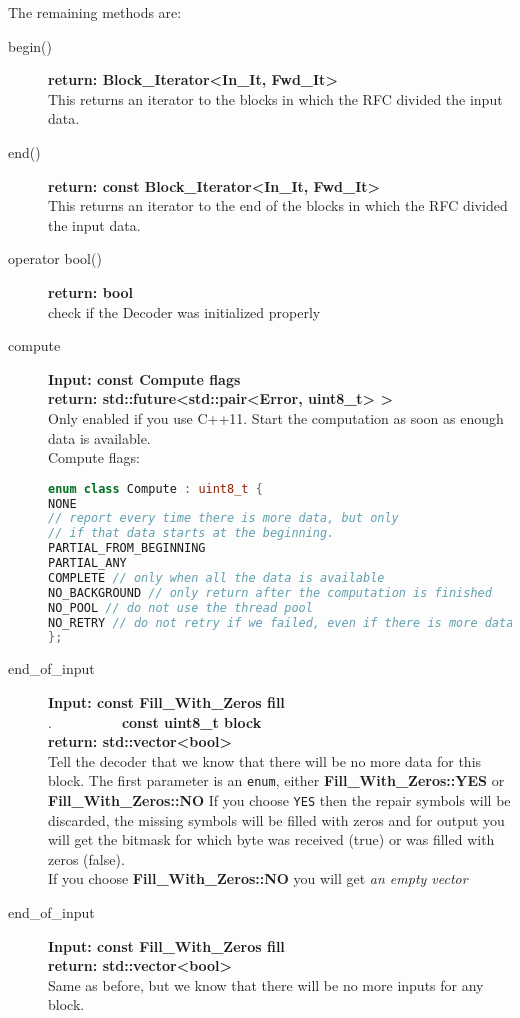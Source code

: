 \documentclass[11pt,a4paper]{refart}
\begin{document}
The remaining methods are:
\begin{description}
\item[begin()] \textbf{return: Block\_Iterator<In\_It, Fwd\_It>}\\
This returns an iterator to the blocks in which the RFC divided the input data.
\item[end()] \textbf{return: const Block\_Iterator<In\_It, Fwd\_It>}\\
This returns an iterator to the end of the blocks in which the RFC divided the input data.
\item[operator bool()] \textbf{return: bool}\\
check if the Decoder was initialized properly

\item[compute] \textbf{Input: const Compute flags}\\
\textbf{return: std::future<std::pair<Error, uint8\_t> >}\\
Only enabled if you use C++11. Start the computation as soon as enough data is available.\\
Compute flags:
\begin{lstlisting}[language=C++]
enum class Compute : uint8_t {
NONE 
// report every time there is more data, but only
// if that data starts at the beginning.
PARTIAL_FROM_BEGINNING
PARTIAL_ANY
COMPLETE // only when all the data is available
NO_BACKGROUND // only return after the computation is finished
NO_POOL // do not use the thread pool
NO_RETRY // do not retry if we failed, even if there is more data
};
\end{lstlisting}

\item[end\_of\_input] \textbf{Input: const Fill\_With\_Zeros fill}\\
.\ \ \ \ \ \ \ \ \ \ \textbf{const uint8\_t block}\\
\textbf{return: std::vector<bool>}\\
Tell the decoder that we know that there will be no more data for this block.
The first parameter is an \texttt{enum}, either \textbf{Fill\_With\_Zeros::YES}  or \textbf{Fill\_With\_Zeros::NO}
If you choose \texttt{YES} then the repair symbols will be discarded, the missing symbols will be filled with zeros
and for output you will get the bitmask for which byte was received (true) or was filled with zeros (false).\\
If you choose \textbf{Fill\_With\_Zeros::NO} you will get \textit{an empty vector}
\item[end\_of\_input] \textbf{Input: const Fill\_With\_Zeros fill}\\
\textbf{return: std::vector<bool>}\\
Same as before, but we know that there will be no more inputs for any block.



\end{description}
\end{document}
